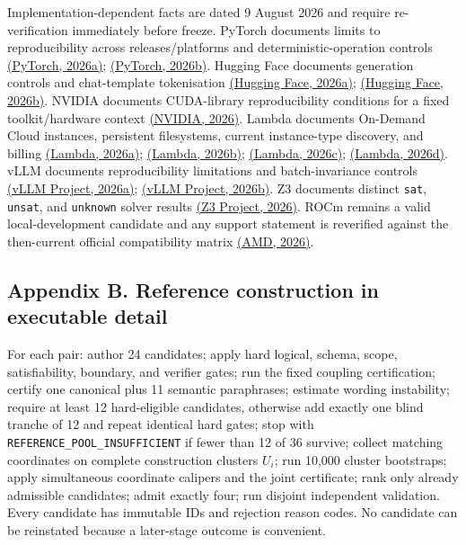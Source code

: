 \documentclass[11pt,a4paper]{article}
\newcommand{\REFPOOL}{\nolinkurl{REFERENCE_POOL_INSUFFICIENT}}
\begin{document}
Implementation-dependent facts are dated 9 August 2026 and require re-verification immediately before freeze. PyTorch documents limits to reproducibility across releases/platforms and deterministic-operation controls \href{https://docs.pytorch.org/docs/stable/notes/randomness.html}{(PyTorch, 2026a)}; \href{https://docs.pytorch.org/docs/stable/generated/torch.use_deterministic_algorithms.html}{(PyTorch, 2026b)}. Hugging Face documents generation controls and chat-template tokenisation \href{https://huggingface.co/docs/transformers/main_classes/text_generation}{(Hugging Face, 2026a)}; \href{https://huggingface.co/docs/transformers/main/chat_templating}{(Hugging Face, 2026b)}. NVIDIA documents CUDA-library reproducibility conditions for a fixed toolkit/hardware context \href{https://docs.nvidia.com/cuda/cublas/index.html}{(NVIDIA, 2026)}. Lambda documents On-Demand Cloud instances, persistent filesystems, current instance-type discovery, and billing \href{https://docs.lambda.ai/public-cloud/on-demand/}{(Lambda, 2026a)}; \href{https://docs.lambda.ai/public-cloud/filesystems/}{(Lambda, 2026b)}; \href{https://docs.lambda.ai/public-cloud/cloud-api/}{(Lambda, 2026c)}; \href{https://docs.lambda.ai/public-cloud/billing/}{(Lambda, 2026d)}. vLLM documents reproducibility limitations and batch-invariance controls \href{https://docs.vllm.ai/en/latest/usage/reproducibility.html}{(vLLM Project, 2026a)}; \href{https://docs.vllm.ai/en/stable/features/batch_invariance/}{(vLLM Project, 2026b)}. Z3 documents distinct \texttt{sat}, \texttt{unsat}, and \texttt{unknown} solver results \href{https://z3prover.github.io/api/html/js/interfaces/Solver.html}{(Z3 Project, 2026)}. ROCm remains a valid local-development candidate and any support statement is reverified against the then-current official compatibility matrix \href{https://rocm.docs.amd.com/en/latest/compatibility/compatibility-matrix.html}{(AMD, 2026)}.

\subsection*{Appendix B. Reference construction in executable detail}
For each pair: author 24 candidates; apply hard logical, schema, scope, satisfiability, boundary, and verifier gates; run the fixed coupling certification; certify one canonical plus 11 semantic paraphrases; estimate wording instability; require at least 12 hard-eligible candidates, otherwise add exactly one blind tranche of 12 and repeat identical hard gates; stop with \REFPOOL{} if fewer than 12 of 36 survive; collect matching coordinates on complete construction clusters $U_i$; run 10,000 cluster bootstraps; apply simultaneous coordinate calipers and the joint certificate; rank only already admissible candidates; admit exactly four; run disjoint independent validation. Every candidate has immutable IDs and rejection reason codes. No candidate can be reinstated because a later-stage outcome is convenient.
\end{document}
